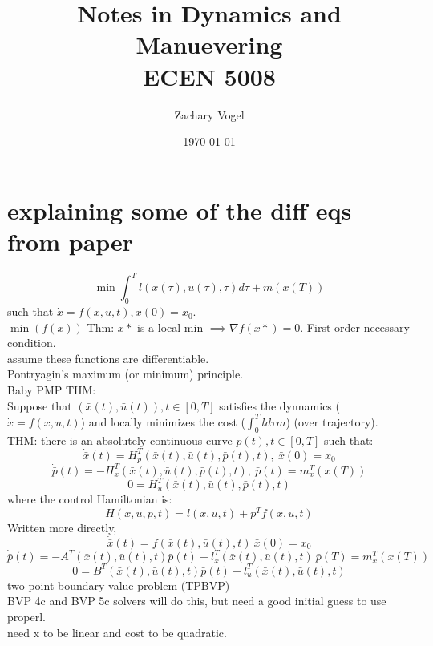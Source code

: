 \documentclass{article}
\author{Zachary Vogel}
\title{Notes in Dynamics and Manuevering\\ ECEN 5008}
\date{\today}
\begin{document}
\maketitle
\section{explaining some of the diff eqs from paper}
\[\min\int_0^T l(x(\tau),u(\tau),\tau)d\tau+m(x(T))\]
such that $\dot{x}=f(x,u,t),x(0)=x_0$.\\
$\min (f(x))$ Thm: $x*$ is a local min $\implies \nabla f(x*)=0$. First order necessary condition.\\
assume these functions are differentiable.\\
Pontryagin's maximum (or minimum) principle.\\
Baby PMP THM:\\
Suppose that $(\bar{x}(t),\bar{u}(t)), t\in[0,T]$ satisfies the dynnamics ($\dot{x}=f(x,u,t)$) and locally minimizes the cost ($\int_0^Tld\tau m$) (over trajectory).\\
THM: there is an absolutely continuous curve $\bar{p}(t), t\in[0,T]$ such that:\\
\[\dot{\bar{x}}(t)=H_p^T(\bar{x}(t),\bar{u}(t),\bar{p}(t),t),\ \bar{x}(0)=x_0\]
\[\dot{\bar{p}}(t)=-H_x^T(\bar{x}(t),\bar{u}(t),\bar{p}(t),t),\ \bar{p}(t)=m_x^T(x(T))\]
\[0=H_u^T(\bar{x}(t),\bar{u}(t),\bar{p}(t),t)\]
where the control Hamiltonian is:
\[H(x,u,p,t)=l(x,u,t)+p^Tf(x,u,t)\]
Written more directly,\\
\[\dot{\bar{x}}(t)=f(\bar{x}(t),\bar{u}(t),t)\ \bar{x}(0)=x_0\]
\[\dot{\bar{p}}(t)=-A^T(\bar{x}(t),\bar{u}(t),t)\bar{p}(t)-l_x^T(\bar{x}(t),\bar{u}(t),t)\ \bar{p}(T)=m_x^T(x(T))\]
\[0=B^T(\bar{x}(t),\bar{u}(t),t)\bar{p}(t)+l_u^T(\bar{x}(t),\bar{u}(t),t)\]
two point boundary value problem (TPBVP)\\
BVP 4c and BVP 5c solvers will do this, but need a good initial guess to use properl.\\
need x to be linear and cost to be quadratic.\\
\end{document}
